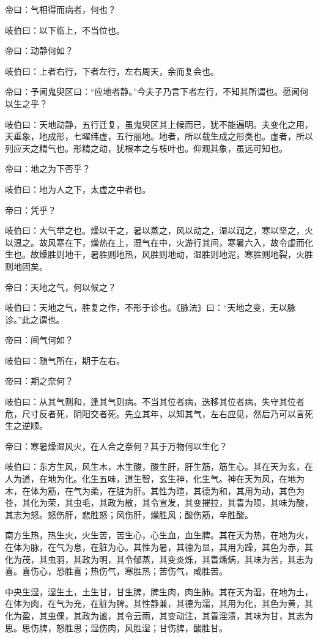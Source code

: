 \documentclass{article}%
\begin{document}
帝曰：气相得而病者，何也？

岐伯曰：以下临上，不当位也。

帝曰：动静何如？

岐伯曰：上者右行，下者左行，左右周天，余而复会也。

帝曰：予闻鬼臾区曰：“应地者静。”今夫子乃言下者左行，不知其所谓也。愿闻何以生之乎？

岐伯曰：天地动静，五行迁复，虽鬼臾区其上候而已，犹不能遍明。夫变化之用，天垂象，地成形，七曜纬虚，五行丽地。地者，所以载生成之形类也。虚者，所以列应天之精气也。形精之动，犹根本之与枝叶也。仰观其象，虽远可知也。

帝曰：地之为下否乎？

岐伯曰：地为人之下，太虚之中者也。

帝曰：凭乎？

岐伯曰：大气举之也。燥以干之，暑以蒸之，风以动之，湿以润之，寒以坚之，火以温之。故风寒在下，燥热在上，湿气在中，火游行其间，寒暑六入，故令虚而化生也。故燥胜则地干，暑胜则地热，风胜则地动，湿胜则地泥，寒胜则地裂，火胜则地固矣。

帝曰：天地之气，何以候之？

岐伯曰：天地之气，胜复之作，不形于诊也。《脉法》曰：“天地之变，无以脉诊。”此之谓也。

帝曰：间气何如？

岐伯曰：随气所在，期于左右。

帝曰：期之奈何？

岐伯曰：从其气则和，逢其气则病。不当其位者病，迭移其位者病，失守其位者危，尺寸反者死，阴阳交者死。先立其年，以知其气，左右应见，然后乃可以言死生之逆顺。

帝曰：寒暑燥湿风火，在人合之奈何？其于万物何以生化？

岐伯曰：东方生风，风生木，木生酸，酸生肝，肝生筋，筋生心。其在天为玄，在人为道，在地为化。化生五味，道生智，玄生神，化生气。神在天为风，在地为木，在体为筋，在气为柔，在脏为肝。其性为暄，其德为和，其用为动，其色为苍，其化为荣，其虫毛，其政为散，其令宣发，其变摧拉，其眚为陨，其味为酸，其志为怒。怒伤肝，悲胜怒；风伤肝，燥胜风；酸伤筋，辛胜酸。

南方生热，热生火，火生苦，苦生心，心生血，血生脾。其在天为热，在地为火，在体为脉，在气为息，在脏为心。其性为暑，其德为显，其用为躁，其色为赤，其化为茂，其虫羽，其政为明，其令郁蒸，其变炎烁，其眚燔焫，其味为苦，其志为喜。喜伤心，恐胜喜；热伤气，寒胜热；苦伤气，咸胜苦。

中央生湿，湿生土，土生甘，甘生脾，脾生肉，肉生肺。其在天为湿，在地为土，在体为肉，在气为充，在脏为脾。其性静兼，其德为濡，其用为化，其色为黄，其化为盈，其虫倮，其政为谧，其令云雨，其变动注，其眚淫溃，其味为甘，其志为思。思伤脾，怒胜思；湿伤肉，风胜湿；甘伤脾，酸胜甘。
\end{document}
